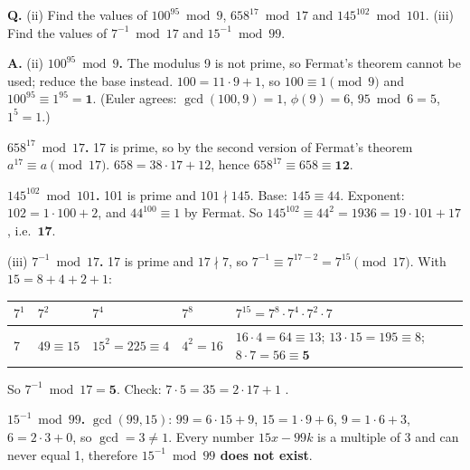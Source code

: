 \begin{worked}
\textbf{Q.} (ii) Find the values of $100^{95} \bmod 9$, $658^{17} \bmod 17$ and $145^{102} \bmod 101$. (iii) Find the values of $7^{-1} \bmod 17$ and $15^{-1} \bmod 99$.

\textbf{A.} (ii) \textbf{$100^{95} \bmod 9$.} The modulus 9 is not prime, so Fermat's theorem cannot be used; reduce the base instead. $100 = 11 \cdot 9 + 1$, so $100 \equiv 1 \pmod 9$ and $100^{95} \equiv 1^{95} = \mathbf{1}$. (Euler agrees: $\gcd(100, 9) = 1$, $\phi(9) = 6$, $95 \bmod 6 = 5$, $1^5 = 1$.)

\textbf{$658^{17} \bmod 17$.} 17 is prime, so by the second version of Fermat's theorem $a^{17} \equiv a \pmod{17}$. $658 = 38 \cdot 17 + 12$, hence $658^{17} \equiv 658 \equiv \mathbf{12}$.

\textbf{$145^{102} \bmod 101$.} 101 is prime and $101 \nmid 145$. Base: $145 \equiv 44$. Exponent: $102 = 1 \cdot 100 + 2$, and $44^{100} \equiv 1$ by Fermat. So $145^{102} \equiv 44^2 = 1936 = 19 \cdot 101 + 17$, i.e.\ $\mathbf{17}$.

(iii) \textbf{$7^{-1} \bmod 17$.} 17 is prime and $17 \nmid 7$, so $7^{-1} \equiv 7^{17-2} = 7^{15} \pmod{17}$. With $15 = 8 + 4 + 2 + 1$:
\begin{center}\small
\begin{tabular}{@{}lllll@{}}
\toprule
$7^1$ & $7^2$ & $7^4$ & $7^8$ & $7^{15} = 7^8 \cdot 7^4 \cdot 7^2 \cdot 7$\\
\midrule
7 & $49 \equiv 15$ & $15^2 = 225 \equiv 4$ & $4^2 = 16$ & $16 \cdot 4 = 64 \equiv 13$;\; $13 \cdot 15 = 195 \equiv 8$;\; $8 \cdot 7 = 56 \equiv \mathbf{5}$\\
\bottomrule
\end{tabular}
\end{center}
So $7^{-1} \bmod 17 = \mathbf{5}$. Check: $7 \cdot 5 = 35 = 2 \cdot 17 + 1$ \checkmark.

\textbf{$15^{-1} \bmod 99$.} $\gcd(99, 15)$: $99 = 6 \cdot 15 + 9$, $15 = 1 \cdot 9 + 6$, $9 = 1 \cdot 6 + 3$, $6 = 2 \cdot 3 + 0$, so $\gcd = 3 \ne 1$. Every number $15x - 99k$ is a multiple of 3 and can never equal 1, therefore \textbf{$15^{-1} \bmod 99$ does not exist}.
\end{worked}

